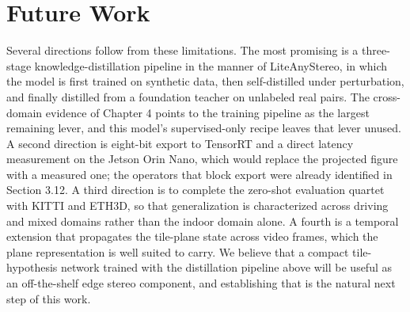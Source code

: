 \section{Future Work}
Several directions follow from these limitations. The most promising is a
three-stage knowledge-distillation pipeline in the manner of
LiteAnyStereo, in which the model is first trained on synthetic data, then
self-distilled under perturbation, and finally distilled from a foundation
teacher on unlabeled real pairs. The cross-domain evidence of Chapter 4
points to the training pipeline as the largest remaining lever, and this
model's supervised-only recipe leaves that lever unused. A second
direction is eight-bit export to TensorRT and a direct latency measurement
on the Jetson Orin Nano, which would replace the projected figure with a
measured one; the operators that block export were already identified in
Section 3.12. A third direction is to complete the zero-shot evaluation
quartet with KITTI and ETH3D, so that generalization is characterized
across driving and mixed domains rather than the indoor domain alone. A
fourth is a temporal extension that propagates the tile-plane state across
video frames, which the plane representation is well suited to carry. We
believe that a compact tile-hypothesis network trained with the
distillation pipeline above will be useful as an off-the-shelf edge stereo
component, and establishing that is the natural next step of this work.

